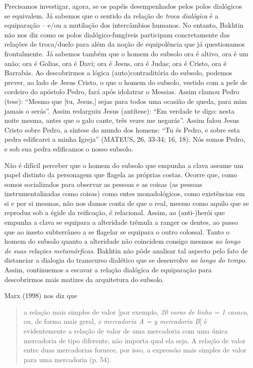 Precisamos investigar, agora, se os papéis desempenhados pelos polos
dialógicos se equivalem. Já sabemos que o sentido da relação de
\emph{troca dialógica} é a equiparação -- e/ou a mutilação dos
intercâmbios humanos. No entanto, Bakhtin não nos diz como os polos
dialógico-fungíveis participam concretamente das relações de troca/duelo
para além da noção de equipolência que já questionamos frontalmente. Já
sabemos também que o homem do subsolo ora é altivo, ora é um anão; ora é
Golias, ora é Davi; ora é Jesus, ora é Judas; ora é Cristo, ora é
Barrabás. Ao descobrirmos a lógica (auto)contraditória do subsolo,
podemos prever, ao lado de Jesus Cristo, o que o homem do subsolo,
vestido com a pele de cordeiro do apóstolo Pedro, fará após idolatrar o
Messias. Assim clamou Pedro (tese): ``Mesmo que {[}tu, Jesus,{]} sejas
para todos uma ocasião de queda, para mim jamais o serás''. Assim
redarguiu Jesus (antítese): ``Em verdade te digo: nesta noite mesma,
antes que o galo cante, três vezes me negarás''. Assim falou Jesus
Cristo sobre Pedro, a síntese do mundo dos homens: ``Tu és Pedro, e
sobre esta pedra edificarei a minha Igreja'' (MATEUS, 26, 33-34; 16,
18). Nós somos Pedro, e sob sua pedra edificamos o nosso subsolo.

Não é difícil perceber que o homem do subsolo que empunha a clava assume
um papel distinto da personagem que flagela as próprias costas. Ocorre
que, como somos socializados para observar as pessoas e as coisas (as
pessoas instrumentalizadas como coisas) como entes monadológicos, como
existências em si e por si mesmas, não nos damos conta de que o real,
mesmo como aquilo que se reproduz sob a égide da reificação, é
relacional. Assim, ao (anti-)herói que empunha a clava se equipara a
alteridade trêmula a ranger os dentes, ao passo que ao inseto
subterrâneo a se flagelar se equipara o outro colossal. Tanto o homem do
subsolo quanto a alteridade não coincidem consigo mesmos \emph{ao longo
de suas relações metamórficas.} Bakhtin não pôde analisar tal aspecto
pelo fato de distanciar a dialogia do transcurso dialético que se
desenvolve \emph{ao longo do tempo.} Assim, continuemos a escavar a
relação dialógica de equiparação para descobrirmos mais matizes da
arquitetura do subsolo.

Marx (1998) nos diz que

\begin{quote}
a relação mais simples de valor {[}por exemplo, \emph{20 varas de linho
= 1 casaco}, ou, de forma mais geral, \emph{x mercadoria A = y
mercadoria B}{]} é evidentemente a relação de valor de uma mercadoria
com uma única mercadoria de tipo diferente, não importa qual ela seja. A
relação de valor entre duas mercadorias fornece, por isso, a expressão
mais simples de valor para uma mercadoria (p. 54).
\end{quote}

